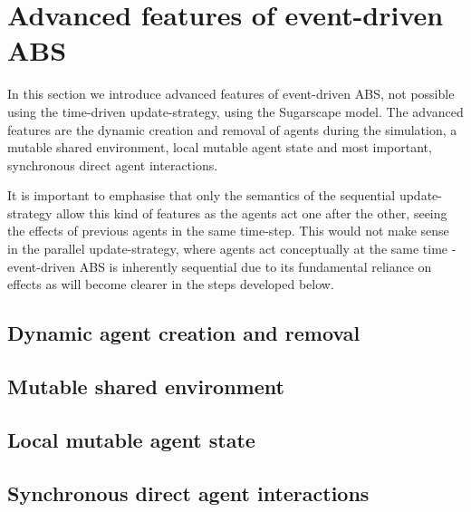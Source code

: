 \section{Advanced features of event-driven ABS}
In this section we introduce advanced features of event-driven ABS, not possible using the time-driven update-strategy, using the Sugarscape model. The advanced features are the dynamic creation and removal of agents during the simulation, a mutable shared environment, local mutable agent state and most important, synchronous direct agent interactions.

It is important to emphasise that only the semantics of the sequential update-strategy allow this kind of features as the agents act one after the other, seeing the effects of previous agents in the same time-step. This would not make sense in the parallel update-strategy, where agents act conceptually at the same time - event-driven ABS is inherently sequential due to its fundamental reliance on effects as will become clearer in the steps developed below.

\subsection{Dynamic agent creation and removal}

\subsection{Mutable shared environment}

\subsection{Local mutable agent state}

\subsection{Synchronous direct agent interactions}